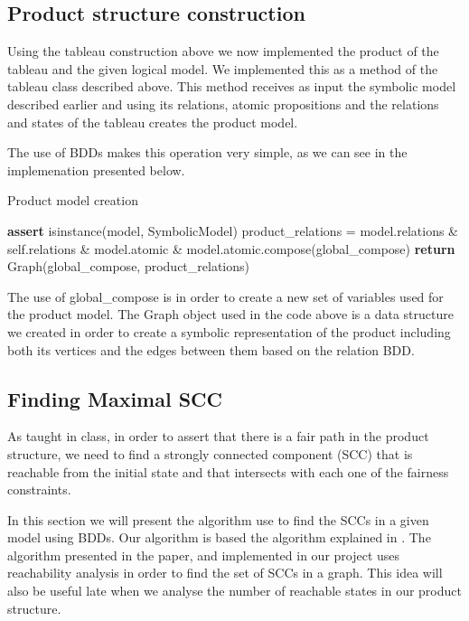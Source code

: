 \documentclass[11pt]{article}
\begin{document}
    \subsection{Product structure construction}
        Using the tableau construction above we now implemented the product of
        the tableau and the given logical model. We implemented this as a 
        method of the tableau class described above. This method receives as
        input the symbolic model described earlier and using its relations,
        atomic propositions and the relations and states of the tableau creates
        the product model.

        The use of BDDs makes this operation very simple, as we can see in the
        implemenation presented below.

        \begin{algorithm}[H]
            \caption{Product model creation}\label{product}
                \State \textbf{assert} isinstance(model, SymbolicModel)
                \State product\_relations = model.relations \& self.relations 
                    \quad\quad\& model.atomic \& model.atomic.compose(global\_compose)
                \State \textbf{return} Graph(global\_compose, product\_relations)
            \EndProcedure
        \end{algorithm}

        The use of global\_compose is in order to create a new set of variables
        used for the product model. The Graph object used in the code above is
        a data structure we created in order to create a symbolic representation
        of the product including both its vertices and the edges between them
        based on the relation BDD.

    \subsection{Finding Maximal SCC}
        As taught in class, in order to assert that there is a fair path in the 
        product structure, we need to find a strongly connected component (SCC)
        that is reachable from the initial state and that intersects with
        each one of the fairness constraints.
        
        In this section we will present the algorithm use to find the SCCs in
        a given model using BDDs. Our algorithm is based the algorithm explained
        in \cite{scc}. The algorithm presented in the paper, and implemented in
        our project uses reachability analysis in order to find the set of SCCs
        in a graph. This idea will also be useful late when we analyse the number
        of reachable states in our product structure.
\end{document}
